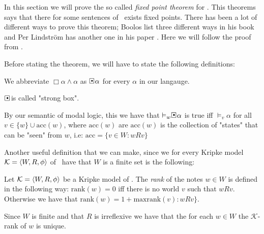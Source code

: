 \documentclass[../main.tex]{subfiles}
\begin{document}
In this section we will prove the so called \textit{fixed point theorem} for
\GL.  This theorems says that there for some sentences of \GL\ exists fixed
points. There has been a lot of different ways to prove this theorem; Boolos
list three different ways in his book \cite{Boolos1993} and Per Lindström has
another one in his paper \cite{Lind1996}. Here we
will follow the proof from \cite{Olson1990}.


Before stating the theorem, we will have to state the following 
definitions:

\begin{defi}
	We abbreviate $\Box\alpha\wedge\alpha$ as $\sBox\alpha$ for every
	$\alpha$ in our langauge.
\end{defi}
$\sBox$ is called "strong box".
\begin{remark}
	\label{rem:acc}
By our semantic of modal logic, this we have that $\vDash_w\sBox\alpha$ is true iff $\vDash_v\alpha$
for all $v\in\{w\}\cup\text{acc}(w)$, where $\text{acc}(w)$ are $\text{acc}(w)$
is the collection of "states" that can be "seen" from $w$, i.e:
$\text{acc}=\{v\in W:wRv\}$
\end{remark}
Another useful definition that we can make, since we for every Kripke model
$\mathcal{K}=\langle W,R,\phi\rangle$ of \GL\  have that $W$ is a finite set is the following:
\begin{defi}
	Let $\mathcal{K}=\langle W,R,\phi\rangle$ be a Kripke model of \GL. The
	\textit{rank} of the notes $w\in W$ is defined in the following
	way: $\text{rank}(w)=0$ iff there is no world $v$ such that
	$wRv$. Otherwise we have that
	$\text{rank}(w)=1+\text{max}\text{rank}(v):wRv\}$.
\end{defi}
Since $W$ is finite and that $R$ is irreflexive we have that the for each $w\in
W$ the $\mathcal{K}$-rank of $w$ is unique.
\end{document}
